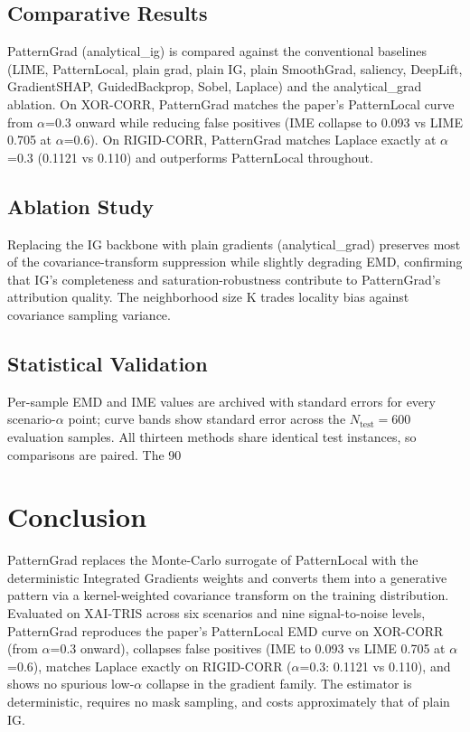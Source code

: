 \documentclass[pdflatex,sn-mathphys-num]{sn-jnl}
\theoremstyle{thmstyleone}
\theoremstyle{thmstyletwo}%
\theoremstyle{thmstylethree}%
\begin{document}
\subsection{Comparative Results}
PatternGrad (analytical\_ig) is compared against the conventional baselines (LIME, PatternLocal, plain grad, plain IG, plain SmoothGrad, saliency, DeepLift, GradientSHAP, GuidedBackprop, Sobel, Laplace) and the analytical\_grad ablation. On XOR-CORR, PatternGrad matches the paper's PatternLocal curve from $\alpha$=0.3 onward while reducing false positives (IME collapse to 0.093 vs LIME 0.705 at $\alpha$=0.6). On RIGID-CORR, PatternGrad matches Laplace exactly at $\alpha$=0.3 (0.1121 vs 0.110) and outperforms PatternLocal throughout.

\subsection{Ablation Study}
Replacing the IG backbone with plain gradients (analytical\_grad) preserves most of the covariance-transform suppression while slightly degrading EMD, confirming that IG's completeness and saturation-robustness contribute to PatternGrad's attribution quality. The neighborhood size K trades locality bias against covariance sampling variance.

\subsection{Statistical Validation}
Per-sample EMD and IME values are archived with standard errors for every scenario-$\alpha$ point; curve bands show standard error across the $N_{\text{test}}=600$ evaluation samples. All thirteen methods share identical test instances, so comparisons are paired. The 90%

\section{Conclusion}\label{sec:conclusion}

PatternGrad replaces the Monte-Carlo surrogate of PatternLocal with the deterministic Integrated Gradients weights and converts them into a generative pattern via a kernel-weighted covariance transform on the training distribution. Evaluated on XAI-TRIS across six scenarios and nine signal-to-noise levels, PatternGrad reproduces the paper's PatternLocal EMD curve on XOR-CORR (from $\alpha$=0.3 onward), collapses false positives (IME to 0.093 vs LIME 0.705 at $\alpha$=0.6), matches Laplace exactly on RIGID-CORR ($\alpha$=0.3: 0.1121 vs 0.110), and shows no spurious low-$\alpha$ collapse in the gradient family. The estimator is deterministic, requires no mask sampling, and costs approximately that of plain IG.
\end{document}
